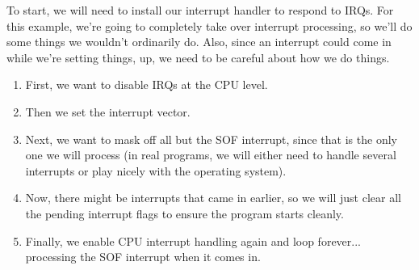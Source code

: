 To start, we will need to install our interrupt handler to respond to IRQs. For this example, we're going to completely take over interrupt processing, so we'll do some things we wouldn't ordinarily do. Also, since an interrupt could come in while we're setting things, up, we need to be careful about how we do things.

\begin{enumerate}
    \item First, we want to disable IRQs at the CPU level.
    \item Then we set the interrupt vector.
    \item Next, we want to mask off all but the SOF interrupt, since that is the only one we will process (in real programs, we will either need to handle several interrupts or play nicely with the operating system).
    \item Now, there might be interrupts that came in earlier, so we will just clear all the pending interrupt flags to ensure the program starts cleanly.
    \item Finally, we enable CPU interrupt handling again and loop forever... processing the SOF interrupt when it comes in.
\end{enumerate}

